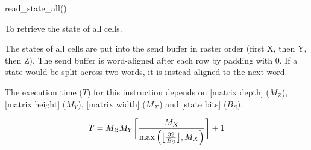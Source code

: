 

\format
read\_state\_all()

\purpose

To retrieve the state of all cells.

\description

The states of all cells are put into the send buffer in raster order (first X, then Y, then Z).
The send buffer is word-aligned after each row by padding with 0.
If a state would be split across two words, it is instead aligned to the next word.

\notes

The execution time ($T$) for this instruction depends on [matrix depth] ($M_Z$), [matrix height] ($M_Y$), [matrix width] ($M_X$) and [state bits] ($B_S$).

$$ T = M_Z M_Y \ceil[\bigg]{ \frac{M_X}{\max \left( \floor[\big]{ \frac{32}{B_S} }, M_X \right)} } + 1 $$
